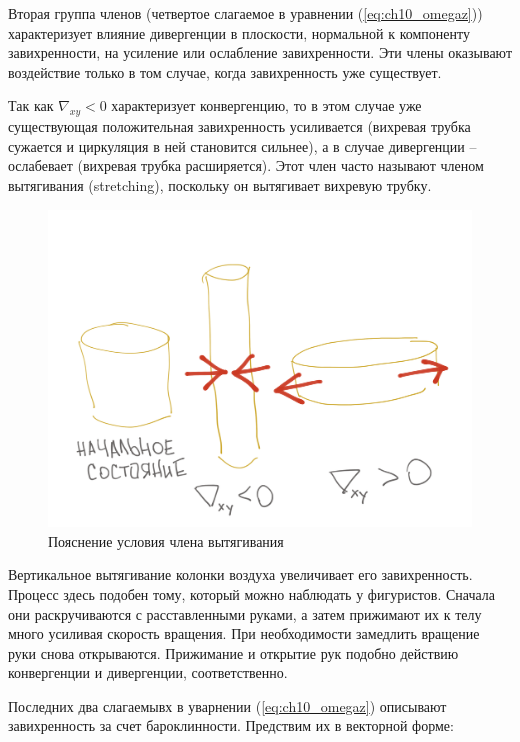 Вторая группа членов (четвертое слагаемое в уравнении (\ref{eq:ch10_omegaz})) характеризует влияние дивергенции в плоскости, нормальной к компоненту завихренности, на усиление или ослабление завихренности. Эти члены оказывают воздействие только в том случае, когда завихренность уже существует. 

Так как $\nabla_{xy}<0$ характеризует конвергенцию, то в этом случае уже существующая положительная завихренность усиливается (вихревая трубка сужается и циркуляция в ней становится сильнее), а в случае дивергенции -- ослабевает (вихревая трубка расширяется). Этот член часто называют членом вытягивания (stretching), поскольку он вытягивает вихревую трубку. 
    \begin{figure}[h]
    \centering
    \includegraphics[width=0.5\linewidth]{pics/ch10.2.png}
    \caption{\label{fig:ch10.2}
    Пояснение условия члена вытягивания
    }
    \end{figure}    
Вертикальное вытягивание колонки воздуха увеличивает его завихренность. Процесс здесь подобен тому, который можно наблюдать у фигуристов. Сначала они раскручиваются с расставленными руками, а затем прижимают их к телу много усиливая скорость вращения. При необходимости замедлить вращение руки снова открываются. Прижимание и открытие рук подобно действию конвергенции и дивергенции, соответственно. 

Последних два слагаемывх в уварнении (\ref{eq:ch10_omegaz}) описывают завихренность за счет бароклинности. Предствим их в векторной форме:

